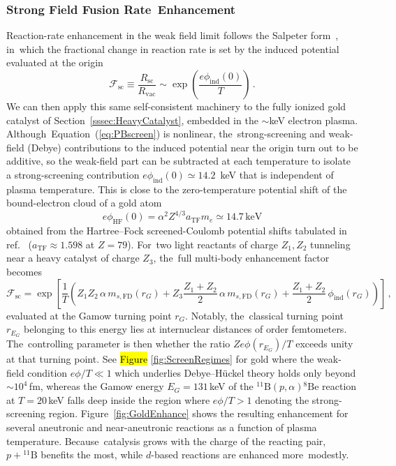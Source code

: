 \documentclass[particles,article,accept,pdftex,moreauthors]{Definitions/mdpi}
\begin{document}
\subsubsection{Strong Field Fusion Rate~Enhancement}\label{sssec:FusionEnhancement}
Reaction-rate enhancement in the weak field limit follows the Salpeter form~\cite{Salpeter:1954nc}, in~which the fractional change in reaction rate is set by the induced potential evaluated at the origin
\begin{equation}\label{eq:salpeter}
\mathcal{F}_\mathrm{sc} \equiv \frac{R_\mathrm{sc}}{R_\mathrm{vac}} \sim \exp\!\left(\frac{e\phi_\mathrm{ind}(0)}{T}\right)\,.
\end{equation}
We can then apply this same self-consistent machinery to the fully ionized gold catalyst of Section~\ref{sssec:HeavyCatalyst}, embedded in the $\sim$keV electron plasma. Although~Equation~(\ref{eq:PBscreen}) is nonlinear, the~strong-screening and weak-field (Debye) contributions to the induced potential near the origin turn out to be additive, so the weak-field part can be subtracted at each temperature to isolate a strong-screening contribution $e\phi_\mathrm{ind}(0)\simeq14.2$~keV that is independent of plasma temperature. This is close to the zero-temperature potential shift of the bound-electron cloud of a gold atom
\begin{equation}
 e\phi_\mathrm{HF}(0)=\alpha^2Z^{4/3}a_\mathrm{TF}m_e\simeq14.7\,\mathrm{keV}
\end{equation}
obtained from the Hartree--Fock screened-Coulomb potential shifts tabulated in ref.~\cite{garrett1967potential} ($a_\mathrm{TF}\approx1.598$ at $Z=79$). For~two light reactants of charge $Z_1,Z_2$ tunneling near a heavy catalyst of charge $Z_3$, the~full multi-body enhancement factor becomes
\begin{equation}\label{eq:goldF}
\mathcal{F}_\mathrm{sc} = \exp\!\left[\frac{1}{T}\left(Z_1Z_2\,\alpha\, m_{s,\mathrm{FD}}(r_G) + Z_3\frac{Z_1+Z_2}{2}\,\alpha\, m_{s,\mathrm{FD}}(r_G) + \frac{Z_1+Z_2}{2}\,\phi_\mathrm{ind}(r_G)\right)\right]\,,
\end{equation}
evaluated at the Gamow turning point $r_G$. Notably, the~classical turning point $r_{E_G}$ belonging to this energy lies at internuclear distances of order femtometers. The~controlling parameter is then whether the ratio $Ze\phi(r_{E_G})/T$ exceeds unity at that turning point. See \hl{Figure} %
\ref{fig:ScreenRegimes} for gold where the weak-field condition $e\phi/T\ll1$ which underlies Debye--H\"uckel theory holds only beyond ${\sim}10^4$\,fm, whereas the Gamow energy $E_G=131$\,keV of the ${}^{11}\mathrm{B}(p,\alpha){}^{8}\mathrm{Be}$ reaction at $T=20$\,keV falls deep inside the region where $e\phi/T>1$ denoting the strong-screening region. Figure~\ref{fig:GoldEnhance} shows the resulting enhancement for several aneutronic and near-aneutronic reactions as a function of plasma temperature. Because~catalysis grows with the charge of the reacting pair, $p+{}^{11}\mathrm{B}$ benefits the most, while $d$-based reactions are enhanced more~modestly.
\end{document}
